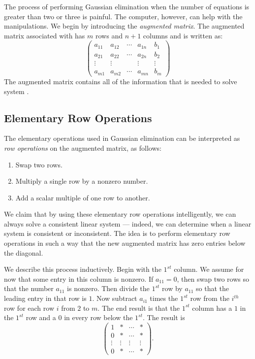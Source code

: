 \documentclass{ximera}
\begin{document}
The process of performing Gaussian elimination when the number
of equations is greater than two or three is painful.  The
computer, however, can help with the manipulations.  We begin by
introducing the {\em augmented matrix\/}. 
The augmented matrix associated with  has
$m$ rows and $n+1$ columns and is written as:
\begin{equation}  \label{augmented}
\left(
\begin{array}{rrrr|r}
 a_{11} & a_{12} & \cdots & a_{1n} &  b_1 \\
 a_{21} & a_{22} & \cdots & a_{2n} &  b_2 \\
 \vdots & \vdots &        & \vdots & \vdots \\
 a_{m1} & a_{m2} & \cdots & a_{mn} &  b_m
\end{array}
\right)
\end{equation}
The augmented matrix contains all of the information that is
needed to solve system .

\subsection*{Elementary Row Operations} 

The elementary operations used in Gaussian elimination
can be interpreted as {\em row operations\/} on
the augmented matrix, as follows:
\begin{enumerate}
\item   Swap two rows.
\item   Multiply a single row by a nonzero number.
\item   Add a scalar multiple of one row to another.
\end{enumerate}
We claim that by using these elementary row operations
intelligently, we can always solve a consistent linear system
--- indeed, we can determine when a linear system is consistent
or inconsistent.  The idea is to perform elementary row
operations in such a way that the new augmented matrix has zero
entries below the diagonal.

We describe this process inductively.  Begin with the $1^{st}$
column.  We assume for now that some entry in this column is
nonzero.  If $a_{11}=0$, then swap two rows so that the
number $a_{11}$ is nonzero.  Then divide the $1^{st}$ row by
$a_{11}$ so that the leading entry in that row is $1$.  Now
subtract $a_{i1}$ times the $1^{st}$ row from the $i^{th}$ row
for each row $i$ from $2$ to $m$.  The end result is that the
$1^{st}$ column has a $1$ in the $1^{st}$ row and a $0$ in every
row below the $1^{st}$.  The result is
\[
\left(\begin{array}{cccc}  1 & * & \cdots & * \\
0 & * & \cdots & * \\ \vdots & \vdots & \vdots & \vdots \\
0 & * & \cdots & * \end{array} \right).
\]
\end{document}
